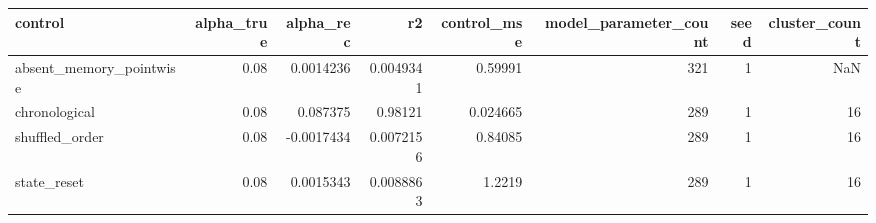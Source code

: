 \begin{tabular}{lrrrrrrr}
\toprule
control & alpha\_true & alpha\_rec & r2 & control\_mse & model\_parameter\_count & seed & cluster\_count \\
\midrule
absent\_memory\_pointwise & 0.08 & 0.0014236 & 0.0049341 & 0.59991 & 321 & 1 & NaN \\
chronological & 0.08 & 0.087375 & 0.98121 & 0.024665 & 289 & 1 & 16 \\
shuffled\_order & 0.08 & -0.0017434 & 0.0072156 & 0.84085 & 289 & 1 & 16 \\
state\_reset & 0.08 & 0.0015343 & 0.0088863 & 1.2219 & 289 & 1 & 16 \\
\bottomrule
\end{tabular}
